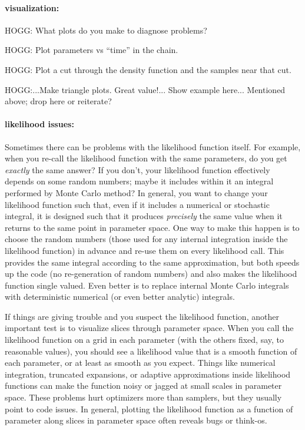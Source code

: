 \documentclass[12pt,twoside,pdftex]{article}
\begin{document}
\paragraph{visualization:}
HOGG: What plots do you make to diagnose problems?

HOGG: Plot parameters vs ``time'' in the chain.

HOGG: Plot a cut through the density function and the samples near that cut.

HOGG:...Make triangle plots.  Great value!...  Show example here... Mentioned above; drop here or reiterate?

\paragraph{likelihood issues:}
Sometimes there can be problems with the likelihood function itself.
For example,
  when you re-call the likelihood function with the same parameters,
  do you get \emph{exactly} the same answer?
If you don't, your likelihood function effectively depends on some random numbers;
  maybe it includes within it an integral performed by Monte Carlo method?
In general, you want to change your likelihood function such that,
  even if it includes a numerical or stochastic integral,
  it is designed such that it produces \emph{precisely} the same
  value when it returns to the same point in parameter space.
One way to make this happen is to choose the random numbers
  (those used for any internal integration inside the likelihood function)
  in advance and re-use them on every likelihood call.
This provides the same integral according to the same approximation,
  but both speeds up the code (no re-generation of random numbers)
  and also makes the likelihood function single valued.
Even better is to replace internal Monte Carlo integrals with
  deterministic numerical (or even better analytic) integrals.

If things are giving trouble and you suspect the likelihood function,
  another important test is to visualize slices through parameter space.
When you call the likelihood function on a grid in each parameter
  (with the others fixed, say, to reasonable values),
  you should see a likelihood value that is a smooth function of each parameter,
  or at least as smooth as you expect.
Things like numerical integration,
  truncated expansions,
  or adaptive approximations
  inside likelihood functions
  can make the function noisy or jagged at small scales in parameter space.
These problems hurt optimizers more than samplers,
  but they usually point to code issues.
In general, plotting the likelihood function as a function of parameter along
  slices in parameter space often reveals bugs or think-os.
\end{document}
